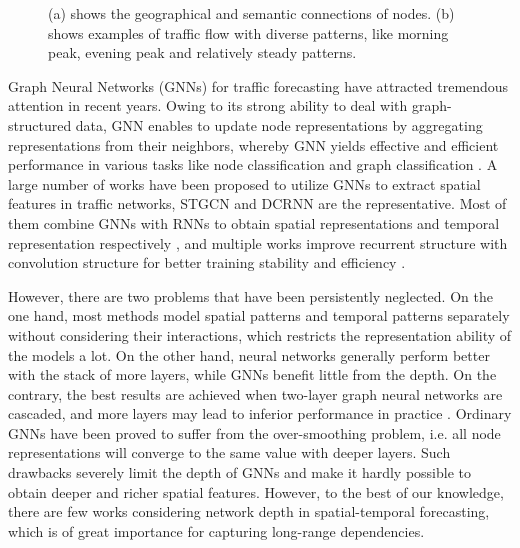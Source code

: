 \documentclass[sigconf]{acmart}
\theoremstyle{definition}
\begin{document}
\begin{figure}[htbp]
\centering
{}
\caption{(a) shows the geographical and semantic connections of nodes. (b) shows examples of traffic flow with diverse patterns, like morning peak, evening peak and relatively steady patterns.}
\end{figure}

Graph Neural Networks (GNNs) for traffic forecasting have attracted tremendous attention in recent years. Owing to its strong ability to deal with graph-structured data, GNN enables to update node representations by aggregating representations from their neighbors, whereby GNN yields effective and efficient performance in various tasks like node classification and graph classification \cite{kipf2016semi, hamilton2017inductive, long2020graph, long2019hierarchical}. A large number of works have been proposed to utilize GNNs to extract spatial features in traffic networks, STGCN \cite{yu2018spatio} and DCRNN \cite{li2018diffusion} are the representative. Most of them combine GNNs with RNNs to obtain spatial representations and temporal representation respectively \cite{zhao2019t, pan2019urban}, and multiple works improve recurrent structure with convolution structure for better training stability and efficiency \cite{zhang2020spatio, fang2019gstnet}.

However, there are two problems that have been persistently neglected. On the one hand, most methods model spatial patterns and temporal patterns separately without considering their interactions, which restricts the representation ability of the models a lot. On the other hand, neural networks generally perform better with the stack of more layers, while GNNs benefit little from the depth. On the contrary, the best results are achieved when two-layer graph neural networks are cascaded, and more layers may lead to inferior performance in practice \cite{zhou2018graph, li2018deeper}. Ordinary GNNs have been proved to suffer from the over-smoothing problem, i.e. all node representations will converge to the same value with deeper layers. Such drawbacks severely limit the depth of GNNs and make it hardly possible to obtain deeper and richer spatial features. However, to the best of our knowledge, there are few works considering network depth in spatial-temporal forecasting, which is of great importance for capturing long-range dependencies.
\end{document}
